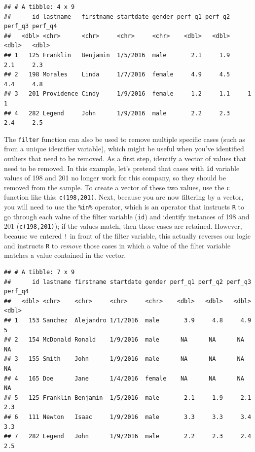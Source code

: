 \documentclass[]{book}
\newenvironment{Shaded}{\begin{snugshade}}{\end{snugshade}}
\newcommand{\KeywordTok}[1]{\textcolor[rgb]{0.13,0.29,0.53}{\textbf{#1}}}
\newcommand{\DecValTok}[1]{\textcolor[rgb]{0.00,0.00,0.81}{#1}}
\newcommand{\StringTok}[1]{\textcolor[rgb]{0.31,0.60,0.02}{#1}}
\newcommand{\CommentTok}[1]{\textcolor[rgb]{0.56,0.35,0.01}{\textit{#1}}}
\newcommand{\OperatorTok}[1]{\textcolor[rgb]{0.81,0.36,0.00}{\textbf{#1}}}
\newcommand{\NormalTok}[1]{#1}
\begin{document}
\begin{verbatim}
## # A tibble: 4 x 9
##      id lastname   firstname startdate gender perf_q1 perf_q2 perf_q3 perf_q4
##   <dbl> <chr>      <chr>     <chr>     <chr>    <dbl>   <dbl>   <dbl>   <dbl>
## 1   125 Franklin   Benjamin  1/5/2016  male       2.1     1.9     2.1     2.3
## 2   198 Morales    Linda     1/7/2016  female     4.9     4.5     4.4     4.8
## 3   201 Providence Cindy     1/9/2016  female     1.2     1.1     1       1  
## 4   282 Legend     John      1/9/2016  male       2.2     2.3     2.4     2.5
\end{verbatim}

The \texttt{filter} function can also be used to remove multiple
specific cases (such as from a unique identifier variable), which might
be useful when you've identified outliers that need to be removed. As a
first step, identify a vector of values that need to be removed. In this
example, let's pretend that cases with \texttt{id} variable values of
198 and 201 no longer work for this company, so they should be removed
from the sample. To create a vector of these two values, use the
\texttt{c} function like this: \texttt{c(198,201)}. Next, because you
are now filtering by a vector, you will need to use the \texttt{\%in\%}
operator, which is an operator that instructs \texttt{R} to go through
each value of the filter variable (\texttt{id}) and identify instances
of 198 and 201 (\texttt{c(198,201)}); if the values match, then those
cases are retained. However, because we entered \texttt{!} in front of
the filter variable, this actually reverses our logic and instructs
\texttt{R} to \emph{remove} those cases in which a value of the filter
variable matches a value contained in the vector.

\begin{Shaded}
\end{Shaded}

\begin{verbatim}
## # A tibble: 7 x 9
##      id lastname firstname startdate gender perf_q1 perf_q2 perf_q3 perf_q4
##   <dbl> <chr>    <chr>     <chr>     <chr>    <dbl>   <dbl>   <dbl>   <dbl>
## 1   153 Sanchez  Alejandro 1/1/2016  male       3.9     4.8     4.9     5  
## 2   154 McDonald Ronald    1/9/2016  male      NA      NA      NA      NA  
## 3   155 Smith    John      1/9/2016  male      NA      NA      NA      NA  
## 4   165 Doe      Jane      1/4/2016  female    NA      NA      NA      NA  
## 5   125 Franklin Benjamin  1/5/2016  male       2.1     1.9     2.1     2.3
## 6   111 Newton   Isaac     1/9/2016  male       3.3     3.3     3.4     3.3
## 7   282 Legend   John      1/9/2016  male       2.2     2.3     2.4     2.5
\end{verbatim}
\end{document}
